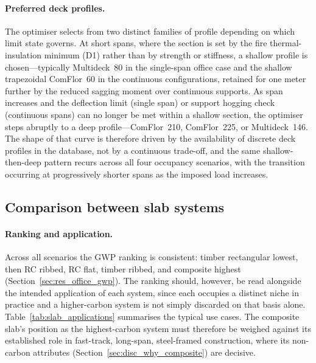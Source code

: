 \paragraph{Preferred deck profiles.} The optimiser selects from two distinct families of profile depending on which limit state governs. At short spans, where the section is set by the fire thermal-insulation minimum (D1) rather than by strength or stiffness, a shallow profile is chosen---typically Multideck~80 in the single-span office case and the shallow trapezoidal ComFlor~60 in the continuous configurations, retained for one meter further by the reduced sagging moment over continuous supports. As span increases and the deflection limit (single span) or support hogging check (continuous spans) can no longer be met within a shallow section, the optimiser steps abruptly to a deep profile---ComFlor~210, ComFlor~225, or Multideck~146. The shape of that curve is therefore driven by the availability of discrete deck profiles in the database, not by a continuous trade-off, and the same shallow-then-deep pattern recurs across all four occupancy scenarios, with the transition occurring at progressively shorter spans as the imposed load increases.

\subsection{Comparison between slab systems}
\label{sec:disc_between}
\paragraph{Ranking and application.} Across all scenarios the GWP ranking is consistent: timber rectangular lowest, then RC ribbed, RC flat, timber ribbed, and composite highest (Section~\ref{sec:res_office_gwp}). The ranking should, however, be read alongside the intended application of each system, since each occupies a distinct niche in practice and a higher-carbon system is not simply discarded on that basis alone. Table~\ref{tab:slab_applications} summarises the typical use cases. The composite slab's position as the highest-carbon system must therefore be weighed against its established role in fast-track, long-span, steel-framed construction, where its non-carbon attributes (Section~\ref{sec:disc_why_composite}) are decisive.

